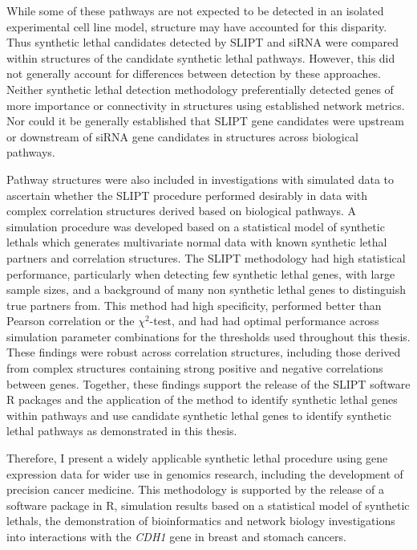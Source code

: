While some of these pathways are not expected to be detected in an isolated experimental cell line model,  structure may have accounted for this disparity. Thus \gls{synthetic lethal} candidates detected by \gls{SLIPT} and \gls{siRNA} were compared within  structures of the candidate \gls{synthetic lethal} pathways. However, this did not generally account for differences between detection by these approaches. Neither \gls{synthetic lethal} detection methodology preferentially detected genes of more importance or connectivity in  structures using established network metrics. Nor could it be generally established that \gls{SLIPT} gene candidates were upstream or downstream of \gls{siRNA} gene candidates in  structures across biological pathways.

Pathway  structures were also included in investigations with simulated data to ascertain whether the \gls{SLIPT} procedure performed desirably in data with complex correlation structures derived based on biological pathways. A simulation procedure was developed based on a statistical model of \glspl{synthetic lethal} which generates multivariate normal data with known \gls{synthetic lethal} partners and correlation structures. The \gls{SLIPT} methodology had high statistical performance, particularly when detecting few \gls{synthetic lethal} genes, with large sample sizes, and a background of many non \gls{synthetic lethal} genes to distinguish true partners from. This method had high specificity, performed better than Pearson correlation or the $\chi^2$-test, and had had optimal performance across simulation parameter combinations for the thresholds used throughout this thesis. These findings were robust across correlation structures, including those derived from complex  structures containing strong positive and negative correlations between genes. 
Together, these findings support the release of the \gls{SLIPT} software R packages and the application of the method to identify \gls{synthetic lethal} genes within pathways and use candidate \gls{synthetic lethal} genes to identify \gls{synthetic lethal} pathways as demonstrated in this thesis.

Therefore, I present a widely applicable \gls{synthetic lethal} procedure using \gls{gene expression} data for wider use in \glspl{genomic} research, including the development of precision cancer medicine. This methodology is supported by the release of a software package in R, simulation results based on a statistical model of \glspl{synthetic lethal}, the demonstration of \gls{bioinformatics} and network biology investigations into interactions with the \textit{CDH1} gene in breast and stomach cancers. 


